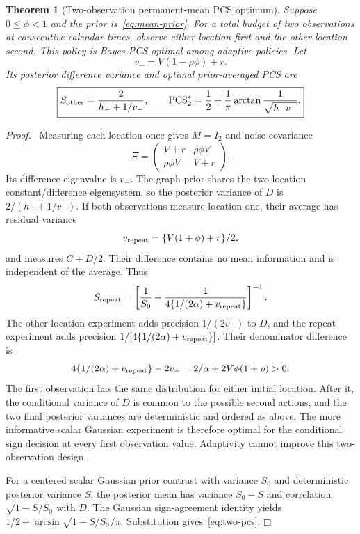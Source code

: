 \documentclass[11pt]{article}
\newtheorem{theorem}{Theorem}
\newenvironment{proof}{\par\noindent\textit{Proof.}\ }{\hfill$\mdlgwhtsquare$\par\medskip}
\newcommand{\PCS}{\operatorname{PCS}}
\begin{document}
\begin{theorem}[Two-observation permanent-mean PCS optimum]
Suppose $0\le\phi<1$ and the prior is~\eqref{eq:mean-prior}. For a total budget of two observations at consecutive calendar times, observe either location first and the other location second. This policy is Bayes-PCS optimal among adaptive policies. Let
\begin{equation}
v_-=V(1-\rho\phi)+r.
\end{equation}
Its posterior difference variance and optimal prior-averaged PCS are
\begin{equation}
\boxed{S_{\rm other}=\frac{2}{h_-+1/v_-},\qquad
\PCS_2^*=\frac12+\frac1\pi\arctan\frac1{\sqrt{h_-v_-}}.}
\label{eq:two-pcs}
\end{equation}
\end{theorem}
\begin{proof}
Measuring each location once gives $M=I_2$ and noise covariance
\[
\Xi=\begin{pmatrix}V+r&\rho\phi V\\\rho\phi V&V+r\end{pmatrix}.
\]
Its difference eigenvalue is $v_-$. The graph prior shares the two-location constant/difference eigensystem, so the posterior variance of $D$ is $2/(h_-+1/v_-)$. If both observations measure location one, their average has residual variance
\[
v_{\rm repeat}=\{V(1+\phi)+r\}/2,
\]
and measures $C+D/2$. Their difference contains no mean information and is independent of the average. Thus
\begin{equation}
S_{\rm repeat}=
\left[\frac1{S_0}+\frac1{4\{1/(2\alpha)+v_{\rm repeat}\}}\right]^{-1}.
\label{eq:repeat}
\end{equation}
The other-location experiment adds precision $1/(2v_-)$ to $D$, and the repeat experiment adds precision $1/[4\{1/(2\alpha)+v_{\rm repeat}\}]$. Their denominator difference is
\[
4\{1/(2\alpha)+v_{\rm repeat}\}-2v_-
=2/\alpha+2V\phi(1+\rho)>0.
\]
The first observation has the same distribution for either initial location. After it, the conditional variance of $D$ is common to the possible second actions, and the two final posterior variances are deterministic and ordered as above. The more informative scalar Gaussian experiment is therefore optimal for the conditional sign decision at every first observation value. Adaptivity cannot improve this two-observation design.

For a centered scalar Gaussian prior contrast with variance $S_0$ and deterministic posterior variance $S$, the posterior mean has variance $S_0-S$ and correlation $\sqrt{1-S/S_0}$ with $D$. The Gaussian sign-agreement identity yields $1/2+\arcsin\sqrt{1-S/S_0}/\pi$. Substitution gives~\eqref{eq:two-pcs}.
\end{proof}
\end{document}
